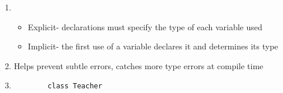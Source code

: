 \documentclass[11pt]{article}
\begin{document}
\begin{enumerate}
\begin{enumerate}
\begin{multicols}{3}
                     \bigskip

                     \begin{Verbatim}
        (1..10).each() {|i|
          puts(i)
        }
                     \end{Verbatim}

                     \bigskip

                     \begin{Verbatim}
        for i in (1..10)
          puts(i)
        end
                     \end{Verbatim}

                     \bigskip

                     \begin{Verbatim}
        i = 1
        while (i <= 10)
          puts(i)
          i += 1
        end
                     \end{Verbatim}

                     \bigskip

                     \begin{Verbatim}
        i = 0
        until ((i += 1) > 10)
          puts(i)
        end
                     \end{Verbatim}

                   \end{multicols}

                  \smallskip

                  Of course other versions are possible as well.

            \item \begin{itemize}

                    \addtolength{\itemsep}{2mm}

                    \item Explicit-­ declarations must specify the type of
                          each variable used

                    \item Implicit-­ the first use of a variable declares it
                          and determines its type

                  \end{itemize}

            \item Helps prevent subtle errors, catches more type errors at
                  compile time

            \item \begin{Verbatim}
        class Teacher


\end{Verbatim}
\end{enumerate}
\end{enumerate}
\end{document}
